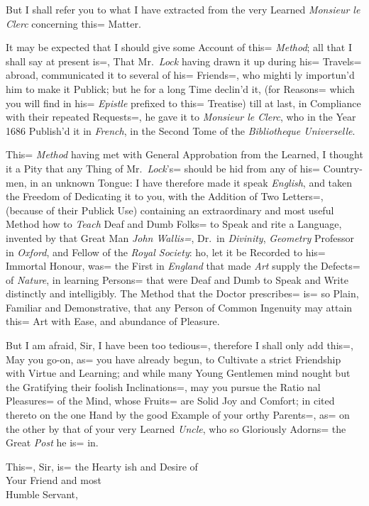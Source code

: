 But I shall refer you to what I have extracted from the very Learned \emph{Monsieur le Clerc} concerning this= Matter.

It may be expected that I should give some Account of this= \emph{Method};
all that I shall say at present is=, That Mr.\ \emph{Lock} having drawn it up during his= Travels= abroad, communicated it to several of his= Friends=, who mighti ly importun'd him to make it Publick;
but he for a long Time declin'd it, (for Reasons= which you will find in his= \emph{Epistle} prefixed to this= Treatise) till at last, in Compliance with their repeated Requests=, he gave it to \emph{Monsieur le Clerc}, who in the Year 1686 Publish'd it in \emph{French}, in the Second Tome of the \emph{Bibliotheque Universelle}.

This= \emph{Method} having met with General Approbation from the Learned, I thought it a Pity that any Thing of Mr.\ \emph{Lock}'s= should be hid from any of his= Country-men, in an unknown Tongue:
I have therefore made it speak \emph{English}, and taken the Freedom of Dedicating it to you, with the Addition of Two Letters=, (because of their Publick Use) containing an extraordinary and most useful Method how to \emph{Teach} Deaf and Dumb Folks= to Speak and \VV rite a Language, invented by that Great Man \emph{John Wallis=}, Dr.\ in \emph{Divinity}, \emph{Geometry} Professor in \emph{Oxford}, and Fellow of the \emph{Royal Society}:
\VV ho, let it be Recorded to his= Immortal Honour, was= the First in \emph{England} that made \emph{Art} supply the Defects= of \emph{Nature}, in learning Persons= that were Deaf and Dumb to Speak and Write distinctly and intelligibly.
The Method that the Doctor prescribes= is= so Plain, Familiar and Demonstrative, that any Person of Common Ingenuity may attain this= Art with Ease, and abundance of Pleasure.

But I am afraid, Sir, I have been too tedious=, therefore I shall only add this=, May you go-on, as= you have already begun, to Cultivate a strict Friendship with Virtue and Learning;
and while many Young Gentlemen mind nought but the Gratifying their foolish Inclinations=, may you pursue the Ratio nal Pleasures= of the Mind, whose Fruits= are Solid Joy and Comfort;
in cited thereto on the one Hand by the good Example of your \VV orthy Parents=, as= on the other by that of your very Learned \emph{Uncle}, who so Gloriously Adorns= the Great \emph{Post} he is= in.

This=, Sir, is= the Hearty \VV ish and Desire of\\[\baselineskip]

{\LARGE\hfill Your Friend and most\hspace*{4ex}}\\[\baselineskip]

{\LARGE\hfill Humble Servant,\hspace*{4ex}}
